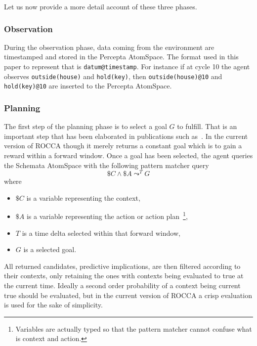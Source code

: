 \documentclass[runningheads]{llncs}
\newcommand{\lpreimp}[1]{\leadsto^{#1}}
\begin{document}
Let us now provide a more detail account of these three phases.

\subsubsection{Observation}
During the observation phase, data coming from the environment are
timestamped and stored in the Percepta AtomSpace.  The format used in
this paper to represent that is \texttt{datum@timestamp}.  For
instance if at cycle 10 the agent observes
\texttt{outside(house)} and
\texttt{hold(key)}, then \texttt{outside(house)@10} and
\texttt{hold(key)@10}
are inserted to the Percepta AtomSpace.

\subsubsection{Planning}

The first step of the planning phase is to select a goal $G$ to
fulfill.  That is an important step that has been elaborated in
publications such as~\cite{TODO, TODO}.  In the current version of
ROCCA though it merely returns a constant goal which is to gain a
reward within a forward window.  Once a goal has been selected, the
agent queries the Schemata AtomSpace with the following pattern
matcher query
$$\$C \land \$A \lpreimp{T} G$$
where
\begin{itemize}
\item $\$C$ is a variable representing the context,
\item $\$A$ is a variable representing the action or action
  plan~\footnote{Variables are actually typed so that the pattern
    matcher cannot confuse what is context and action.},
\item $T$ is a time delta selected within that forward window,
\item $G$ is a selected goal.
\end{itemize}
All returned candidates, predictive implications, are then filtered
according to their contexts, only retaining the ones with contexts
being evaluated to true at the current time.  Ideally a second order
probability of a context being current true should be evaluated, but
in the current version of ROCCA a crisp evaluation is used for the
sake of simplicity.
\end{document}

